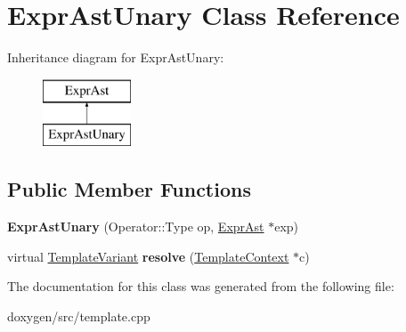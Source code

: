 \hypertarget{class_expr_ast_unary}{}\section{Expr\+Ast\+Unary Class Reference}
\label{class_expr_ast_unary}
Inheritance diagram for Expr\+Ast\+Unary\+:\begin{figure}[H]
\begin{center}
\leavevmode
\includegraphics[height=2.000000cm]{class_expr_ast_unary}
\end{center}
\end{figure}
\subsection*{Public Member Functions}
\begin{DoxyCompactItemize}
\item 
\mbox{\label{class_expr_ast_unary_a8aac14375d963bf4a50a1ee84787b087}} 
{\bfseries Expr\+Ast\+Unary} (Operator\+::\+Type op, \mbox{\hyperlink{class_expr_ast}{Expr\+Ast}} $\ast$exp)
\item 
\mbox{\label{class_expr_ast_unary_af9f16e5d361ef71511fc78011e30098d}} 
virtual \mbox{\hyperlink{class_template_variant}{Template\+Variant}} {\bfseries resolve} (\mbox{\hyperlink{class_template_context}{Template\+Context}} $\ast$c)
\end{DoxyCompactItemize}


The documentation for this class was generated from the following file\+:\begin{DoxyCompactItemize}
\item 
doxygen/src/template.\+cpp\end{DoxyCompactItemize}

